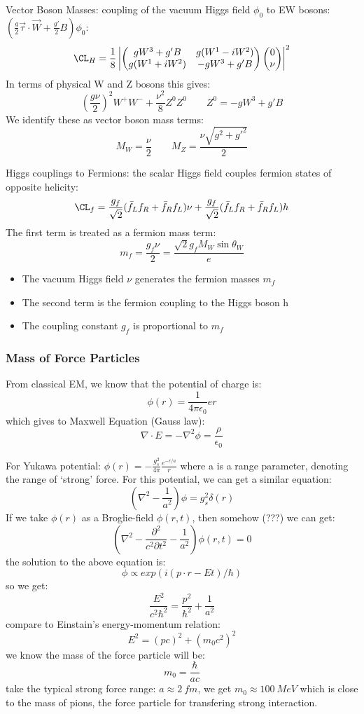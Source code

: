 Vector Boson Masses:
coupling of the vacuum Higgs field $\phi_0$ to EW bosons: 
$\left( \frac{g}{2}\vec{\tau}\cdot\vec{W} + \frac{g'}{2}B\right) \phi_0 $:
\begin{equation*}
\CL_H = \frac{1}{8} \left| 
    \begin{pmatrix}
	gW^3 + g'B  & g(W^1 - iW^2) \\
	g(W^1 + iW^2)	& -gW^3 + g'B	\\
    \end{pmatrix}
    \begin{pmatrix}
	0   \\
	\nu \\
    \end{pmatrix}
    \right|^2
\end{equation*}
In terms of physical W and Z bosons this gives:
$$ \left( \frac{g\nu}{2} \right)^2 W^+W^- + \frac{\nu^2}{8}Z^0Z^0 \qquad Z^0 = -gW^3 + g'B $$
We identify these as vector boson mass terms:
$$ M_W = \frac{\nu }{2} \qquad M_Z = \frac{\nu\sqrt{g^2 + g'^2}}{2} $$

Higgs couplings to Fermions:
the scalar Higgs field couples fermion states of opposite helicity:
$$ \CL_f = \frac{g_f}{\sqrt{2}} (\bar{f}_L f_R + \bar{f}_Rf_L)\nu + \frac{g_f}{\sqrt{2}} (\bar{f}_L f_R + \bar{f}_R f_L) h$$
The first term is treated as a fermion mass term:
$$ m_f = \frac{g_f\nu}{2} = \frac{\sqrt{2}g_f M_W\sin\theta_W}{e}$$
\begin{itemize}
    \item The vacuum Higgs field $\nu$ generates the fermion masses $m_f$
    \item The second term is the fermion coupling to the Higgs boson h
    \item The coupling constant $g_f$ is proportional to $m_f$
\end{itemize}
\subsubsection{Mass of Force Particles}
From classical EM, we know that the potential of charge is:
$$ \phi(r) = \frac{1}{4\pi \epsilon_0}{e}{r} $$
which gives to Maxwell Equation (Gauss law):
$$ \nabla \cdot E = -\nabla^2\phi = \frac{\rho}{\epsilon_0} $$

For Yukawa potential: $\phi(r) = -\frac{g_s^2}{4\pi}\frac{e^{-r/a}}{r}$
where a is a range parameter, denoting the range of `strong' force.
For this potential, we can get a similar equation:
$$ \left(\nabla^2 -\frac{1}{a^2}\right)\phi = g_s^2 \delta(r)$$
If we take $\phi(r)$ as a Broglie-field $\phi(r, t)$, then somehow (???) we can get:
$$ \left( \nabla^2 - \frac{\partial^2}{c^2\partial t^2} - \frac{1}{a^2}\right) \phi(r, t) = 0 $$
the solution to the above equation is:
$$ \phi \propto exp(i(p\cdot r - Et)/\hbar)$$
so we get:
$$ \frac{E^2}{c^2\hbar^2} = \frac{p^2}{\hbar^2} + \frac{1}{a^2}$$
compare to Einstain's energy-momentum relation:
$$ E^2 = (pc)^2 + (m_0c^2)^2$$
we know the mass of the force particle will be:
$$ m_0 = \frac{\hbar}{ac} $$
take the typical strong force range: $a \approx 2 \ fm$, we get $m_0 \approx 100\ MeV$
which is close to the mass of pions, the force particle for transfering strong
interaction.

